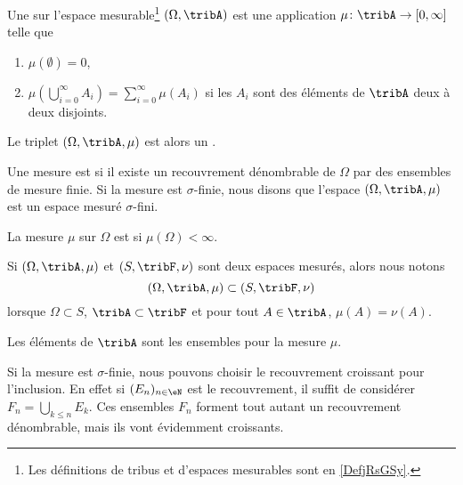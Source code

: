 \begin{definition}  \label{DefBTsgznn}
	Une  sur l'espace mesurable\footnote{Les définitions de tribus et d'espaces mesurables sont en \ref{DefjRsGSy}.} \( (\Omega,\tribA)\) est une application \( \mu\colon \tribA\to \mathopen[ 0 , \infty \mathclose]\) telle que
	\begin{enumerate}
		\item
		      \( \mu(\emptyset)=0\),
		\item       \label{ItemQFjtOjXiii}
		      \( \mu\left( \bigcup_{i=0}^{\infty}A_i\right)=\sum_{i=0}^{\infty}\mu(A_i)\) si les \( A_i\) sont des éléments de \( \tribA\) deux à deux disjoints.
	\end{enumerate}
	Le triplet \( (\Omega,\tribA,\mu)\) est alors un .

	Une mesure est  si il existe un recouvrement dénombrable de \( \Omega\) par des ensembles de mesure finie. Si la mesure est \( \sigma\)-finie, nous disons que l'espace \( (\Omega,\tribA,\mu)\) est un espace mesuré \( \sigma\)-fini.

	La mesure \( \mu\) sur \( \Omega\) est  si \( \mu(\Omega)<\infty\).
\end{definition}

Si \( (\Omega,\tribA,\mu)\) et \( (S,\tribF,\nu)\) sont deux espaces mesurés, alors nous notons
\begin{equation}
	(\Omega,\tribA,\mu)\subset (S,\tribF,\nu)
\end{equation}
lorsque \( \Omega\subset S\), \( \tribA\subset\tribF\) et pour tout \( A\in\tribA\), \( \mu(A)=\nu(A)\).

\begin{definition}\label{DefHGsQxHB}
	Les éléments de \( \tribA\) sont les ensembles  pour la mesure \( \mu\).
\end{definition}

Si la mesure est \( \sigma\)-finie, nous pouvons choisir le recouvrement croissant pour l'inclusion. En effet si \( (E_n)_{n\in \eN}\) est le recouvrement, il suffit de considérer \( F_n=\bigcup_{k\leq n}E_k\). Ces ensembles \( F_n\) forment tout autant un recouvrement dénombrable, mais ils vont évidemment croissants.

